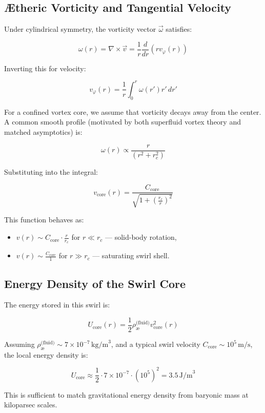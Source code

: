 \documentclass[12pt]{article}
\begin{document}
\subsection{Ætheric Vorticity and Tangential Velocity}

Under cylindrical symmetry, the vorticity vector \( \vec{\omega} \) satisfies:

\[
\omega(r) = \nabla \times \vec{v} = \frac{1}{r} \frac{d}{dr} \left( r v_\varphi(r) \right)
\]

Inverting this for velocity:

\[
v_\varphi(r) = \frac{1}{r} \int_0^r \omega(r') r' \, dr'
\]

For a confined vortex core, we assume that vorticity decays away from the center. A common smooth profile (motivated by both superfluid vortex theory and matched asymptotics) is:

\[
\omega(r) \propto \frac{r}{(r^2 + r_c^2)}
\]

Substituting into the integral:

\[
v_\text{core}(r) = \frac{C_{\text{core}}}{\sqrt{1 + \left( \frac{r_c}{r} \right)^2 }}
\]

This function behaves as:
\begin{itemize}
    \item \( v(r) \sim C_{\text{core}} \cdot \frac{r}{r_c} \) for \( r \ll r_c \) — solid-body rotation,
    \item \( v(r) \sim \frac{C_{\text{core}}}{1} \) for \( r \gg r_c \) — saturating swirl shell.
\end{itemize}

\subsection{Energy Density of the Swirl Core}

The energy stored in this swirl is:

\[
U_{\text{core}}(r) = \frac{1}{2} \rho_{\text{\ae}}^{\text{(fluid)}} v_\text{core}^2(r)
\]

Assuming \( \rho_{\text{\ae}}^{\text{(fluid)}} \sim 7 \times 10^{-7}\, \text{kg/m}^3 \), and a typical swirl velocity \( C_{\text{core}} \sim 10^5\, \text{m/s} \), the local energy density is:

\[
U_{\text{core}} \approx \frac{1}{2} \cdot 7 \times 10^{-7} \cdot (10^5)^2 = 3.5\, \text{J/m}^3
\]

This is sufficient to match gravitational energy density from baryonic mass at kiloparsec scales.
\end{document}
